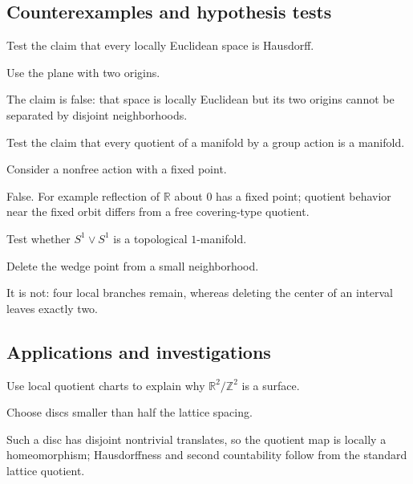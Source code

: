 \subsection*{Counterexamples and hypothesis tests}

\begin{exercise}\label{exr:vii01-ped-10}
Test the claim that every locally Euclidean space is Hausdorff.
\end{exercise}
\begin{hint}
Use the plane with two origins.
\end{hint}
\begin{solution}
The claim is false: that space is locally Euclidean but its two origins cannot be separated by disjoint neighborhoods.
\end{solution}

\begin{exercise}\label{exr:vii01-ped-11}
Test the claim that every quotient of a manifold by a group action is a manifold.
\end{exercise}
\begin{hint}
Consider a nonfree action with a fixed point.
\end{hint}
\begin{solution}
False.  For example reflection of \(\mathbb R\) about \(0\) has a fixed point; quotient behavior near the fixed orbit differs from a free covering-type quotient.
\end{solution}

\begin{exercise}\label{exr:vii01-ped-12}
Test whether \(S^1\vee S^1\) is a topological \(1\)-manifold.
\end{exercise}
\begin{hint}
Delete the wedge point from a small neighborhood.
\end{hint}
\begin{solution}
It is not: four local branches remain, whereas deleting the center of an interval leaves exactly two.
\end{solution}

\subsection*{Applications and investigations}

\begin{exercise}\label{exr:vii01-ped-13}
Use local quotient charts to explain why \(\mathbb R^2/\mathbb Z^2\) is a surface.
\end{exercise}
\begin{hint}
Choose discs smaller than half the lattice spacing.
\end{hint}
\begin{solution}
Such a disc has disjoint nontrivial translates, so the quotient map is locally a homeomorphism; Hausdorffness and second countability follow from the standard lattice quotient.
\end{solution}

